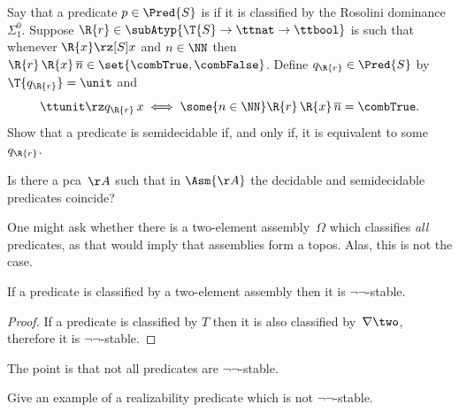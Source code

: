 \begin{exercise}
  Say that a predicate $p \in \Pred{S}$ is  if it is classified by the Rosolini dominance $\Sigma^0_1$. 
  Suppose $\R{r} \in \subAtyp{\T{S} \to \ttnat \to \ttbool}$ is such that
  whenever $\R{x} \rz[S] x$ and $n \in \NN$ then $\R{r}\,\R{x}\,\overline{n} \in \set{\combTrue, \combFalse}$. Define $q_{\R{r}} \in \Pred{S}$ by $\T{q_{\R{r}}} = \unit$ and
  \begin{equation*}
    \ttunit \rz q_{\R{r}}\,x
    \iff \some{n \in \NN} \R{r}\,\R{x}\,\overline{n} = \combTrue.
  \end{equation*}
  Show that a predicate is semidecidable if, and only if, it is equivalent to some~$q_{\R{r}}$.
\end{exercise}

\begin{exercise}
  Is there a pca~$\AA$ such that in $\Asm{\AA}$ the decidable and semidecidable predicates coincide?
\end{exercise}

One might ask whether there is a two-element assembly~$\Omega$ which classifies \emph{all} predicates, as that would imply that assemblies form a topos. Alas, this is not the case.

\begin{proposition}
  If a predicate is classified by a two-element assembly then it is $\lnot\lnot$-stable.
\end{proposition}

\begin{proof}
  If a predicate is classified by $T$ then it is also classified by~$\nabla \two$, therefore it is $\lnot\lnot$-stable.
\end{proof}

The point is that not all predicates are $\lnot\lnot$-stable.

\begin{exercise}
  Give an example of a realizability predicate which is not $\lnot\lnot$-stable.
\end{exercise}



